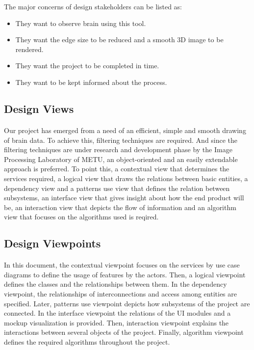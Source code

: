 The major concerns of design stakeholders can be listed as:
\begin{itemize}
	\item They want to observe brain using this tool. 
    \item They want the edge size to be reduced and a smooth 3D image to be rendered.
	\item They want the project to be completed in time. 
    \item They want to be kept informed about the process.
\end{itemize}

\skipsubsection
    

\subsection{Design Views}
\paragraph{}
\normalsize
Our project has emerged from a need of an efficient, simple and smooth drawing of brain data. To achieve this, filtering techniques are required. And since the filtering techniques are under research and development phase by the Image Processing Laboratory of METU, an object-oriented and an easily extendable approach is preferred. To point this, a contextual view that determines the services required, a logical view that draws the relations between basic entities, a dependency view and a patterns use view that defines the relation between subsystems, an interface view that gives insight about how the end product will be, an interaction view that depicts the flow of information and an algorithm view that focuses on the algorithms used is reqired. 
\skipsubsection
 
 
\subsection{Design Viewpoints}
\paragraph{}
\normalsize
In this document, the contextual viewpoint focuses on the services by use case diagrams to define the usage of features by the actors. Then, a logical viewpoint defines the classes and the relationships between them. In the dependency viewpoint, the relationships of interconnections and access among entities are specified. Later, patterns use viewpoint depicts how subsystems of the project are connected. In the interface viewpoint the relations of the UI modules and a mockup visualization is provided. Then, interaction viewpoint explains the interactions between several objects of the project. Finally, algorithm viewpoint defines the required algorithms throughout the project.
\skipsubsection


